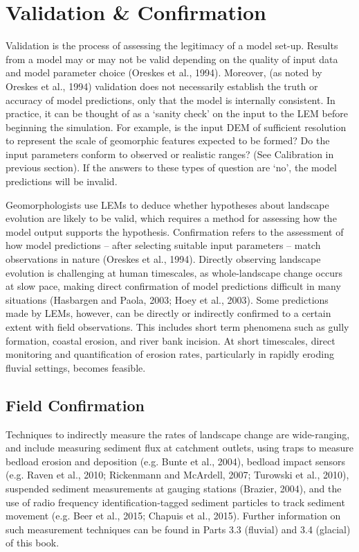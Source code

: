 \section{Validation \& Confirmation}
Validation is the process of assessing the legitimacy of a model set-up. Results from a model may or may not be valid depending on the quality of input data and model parameter choice (Oreskes et al., 1994). Moreover, (as noted by Oreskes et al., 1994) validation does not necessarily establish the truth or accuracy of model predictions, only that the model is internally consistent. In practice, it can be thought of as a ‘sanity check’ on the input to the LEM before beginning the simulation. For example, is the input DEM of sufficient resolution to represent the scale of geomorphic features expected to be formed? Do the input parameters conform to observed or realistic ranges? (See Calibration in previous section). If the answers to these types of question are ‘no’, the model predictions will be invalid. 

Geomorphologists use LEMs to deduce whether hypotheses about landscape evolution are likely to be valid, which requires a method for assessing how the model output supports the hypothesis. Confirmation refers to the assessment of how model predictions – after selecting suitable input parameters – match observations in nature (Oreskes et al., 1994). Directly observing landscape evolution is challenging at human timescales, as whole-landscape change occurs at slow pace, making direct confirmation of model predictions difficult in many situations (Hasbargen and Paola, 2003; Hoey et al., 2003). Some predictions made by LEMs, however, can be directly or indirectly confirmed to a certain extent with field observations. This includes short term phenomena such as gully formation, coastal erosion, and river bank incision. At short timescales, direct monitoring and quantification of erosion rates, particularly in rapidly eroding fluvial settings, becomes feasible. 

\subsection{Field Confirmation}
Techniques to indirectly measure the rates of landscape change are wide-ranging, and include measuring sediment flux at catchment outlets, using traps to measure bedload erosion and deposition (e.g. Bunte et al., 2004), bedload impact sensors (e.g. Raven et al., 2010; Rickenmann and McArdell, 2007; Turowski et al., 2010), suspended sediment measurements at gauging stations (Brazier, 2004), and the use of radio frequency identification-tagged sediment particles to track sediment movement (e.g. Beer et al., 2015; Chapuis et al., 2015). Further information on such measurement techniques can be found in Parts 3.3 (fluvial) and 3.4 (glacial) of this book. 

